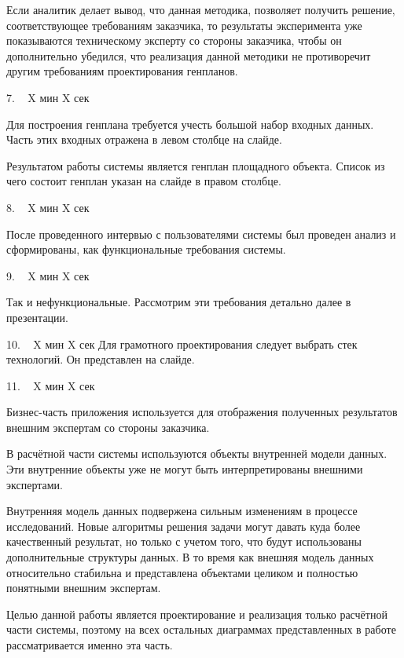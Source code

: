 \documentclass[11pt]{article}
\begin{document}
    Если аналитик делает вывод, что данная методика, позволяет получить решение, соответствующее требованиям
    заказчика, то результаты эксперимента уже показываются техническому эксперту со стороны заказчика,
    чтобы он дополнительно убедился, что реализация данной методики не противоречит другим требованиям
    проектирования генпланов.

    7. ~ X мин X сек

    Для построения генплана требуется учесть большой набор входных данных.
    Часть этих входных отражена в левом столбце на слайде.

    Результатом работы системы является генплан площадного объекта.
    Список из чего состоит генплан указан на слайде в правом столбце.

    8. ~ X мин X сек

    После проведенного интервью с пользователями системы был проведен анализ и сформированы,
    как функциональные требования системы.

    9. ~ X мин X сек

    Так и нефункциональные.
    Рассмотрим эти требования детально далее в презентации.

    10. ~ X мин X сек
    Для грамотного проектирования следует выбрать стек технологий. Он представлен на слайде.

    11. ~ X мин X сек

    Бизнес-часть приложения используется для отображения полученных результатов внешним экспертам со стороны заказчика.

    В расчётной части системы используются объекты внутренней модели данных.
    Эти внутренние объекты уже не могут быть интерпретированы внешними экспертами.

    Внутренняя модель данных подвержена сильным изменениям в процессе исследований.
    Новые алгоритмы решения задачи могут давать куда более качественный результат, но только с учетом того, что
    будут использованы дополнительные структуры данных. В то время как внешняя модель данных относительно стабильна
    и представлена объектами целиком и полностью понятными внешним экспертам.

    Целью данной работы является проектирование и реализация только расчётной части системы, поэтому на всех остальных
    диаграммах представленных в работе рассматривается именно эта часть.
\end{document}
